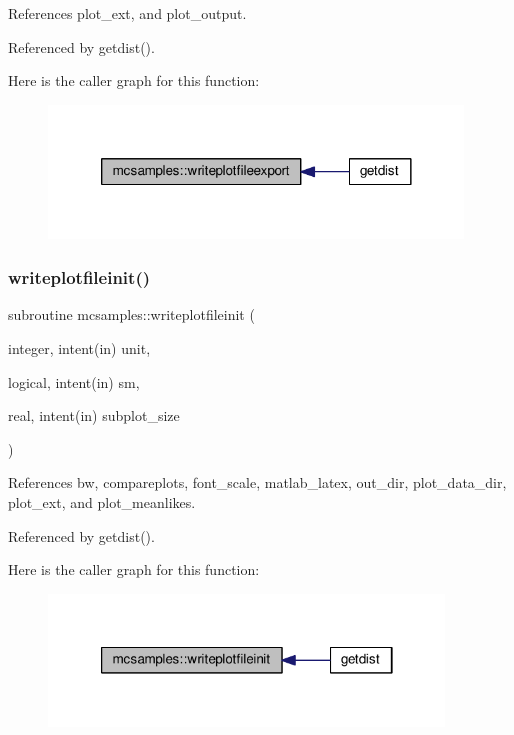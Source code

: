 References plot\+\_\+ext, and plot\+\_\+output.



Referenced by getdist().

Here is the caller graph for this function\+:
\nopagebreak
\begin{figure}[H]
\begin{center}
\leavevmode
\includegraphics[width=312pt]{namespacemcsamples_aeb1af08402647e8ef9e1d8f97e774e3a_icgraph}
\end{center}
\end{figure}
\mbox{\label{namespacemcsamples_a22e27e5c21abdb2a3d8cf2816d2f8acb}} 
\subsubsection{\texorpdfstring{writeplotfileinit()}{writeplotfileinit()}}
{\footnotesize\ttfamily subroutine mcsamples\+::writeplotfileinit (\begin{DoxyParamCaption}\item[{integer, intent(in)}]{unit,  }\item[{logical, intent(in)}]{sm,  }\item[{real, intent(in)}]{subplot\+\_\+size }\end{DoxyParamCaption})}



References bw, compareplots, font\+\_\+scale, matlab\+\_\+latex, out\+\_\+dir, plot\+\_\+data\+\_\+dir, plot\+\_\+ext, and plot\+\_\+meanlikes.



Referenced by getdist().

Here is the caller graph for this function\+:
\nopagebreak
\begin{figure}[H]
\begin{center}
\leavevmode
\includegraphics[width=298pt]{namespacemcsamples_a22e27e5c21abdb2a3d8cf2816d2f8acb_icgraph}
\end{center}
\end{figure}
\mbox{\label{namespacemcsamples_a54c3f403eb92b30ff78476abea37462c}} 
